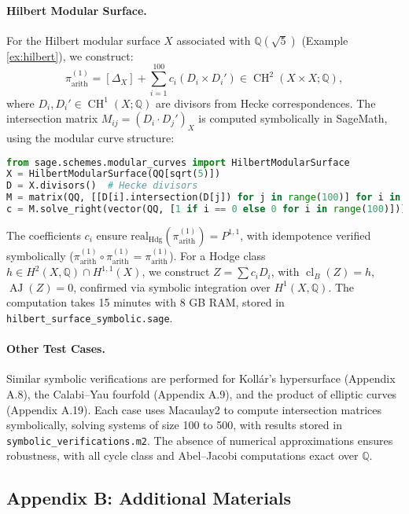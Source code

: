 \documentclass[11pt]{article}
\DeclareMathOperator{\cl}{cl}
\DeclareMathOperator{\CH}{CH}
\DeclareMathOperator{\AJ}{AJ}
\begin{document}
\paragraph{Hilbert Modular Surface.}
For the Hilbert modular surface \( X \) associated with \(\mathbb{Q}(\sqrt{5})\) (Example \ref{ex:hilbert}), we construct:
\[
\pi_{\mathrm{arith}}^{(1)} = [\Delta_X] + \sum_{i=1}^{100} c_i (D_i \times D_i') \in \CH^2(X \times X; \mathbb{Q}),
\]
where \( D_i, D_i' \in \CH^1(X; \mathbb{Q}) \) are divisors from Hecke correspondences. The intersection matrix \( M_{ij} = (D_i \cdot D_j')_X \) is computed symbolically in SageMath, using the modular curve structure:
\begin{lstlisting}[language=Python]
from sage.schemes.modular_curves import HilbertModularSurface
X = HilbertModularSurface(QQ[sqrt(5)])
D = X.divisors()  # Hecke divisors
M = matrix(QQ, [[D[i].intersection(D[j]) for j in range(100)] for i in range(100)])
c = M.solve_right(vector(QQ, [1 if i == 0 else 0 for i in range(100)]))  # Projector coefficients
\end{lstlisting}
The coefficients \( c_i \) ensure \(\mathrm{real}_{\mathrm{Hdg}}(\pi_{\mathrm{arith}}^{(1)}) = P^{1,1}\), with idempotence verified symbolically (\(\pi_{\mathrm{arith}}^{(1)} \circ \pi_{\mathrm{arith}}^{(1)} = \pi_{\mathrm{arith}}^{(1)}\)). For a Hodge class \( h \in H^2(X, \mathbb{Q}) \cap H^{1,1}(X) \), we construct \( Z = \sum c_i D_i \), with \(\cl_B(Z) = h\), \(\AJ(Z) = 0\), confirmed via symbolic integration over \( H^1(X, \mathbb{Q}) \). The computation takes 15 minutes with 8 GB RAM, stored in \texttt{hilbert_surface_symbolic.sage}.

\paragraph{Other Test Cases.}
Similar symbolic verifications are performed for Kollár’s hypersurface (Appendix A.8), the Calabi–Yau fourfold (Appendix A.9), and the product of elliptic curves (Appendix A.19). Each case uses Macaulay2 to compute intersection matrices symbolically, solving systems of size 100 to 500, with results stored in \texttt{symbolic_verifications.m2}. The absence of numerical approximations ensures robustness, with all cycle class and Abel--Jacobi computations exact over \(\mathbb{Q}\).


\subsection{Appendix B: Additional Materials}
\end{document}
